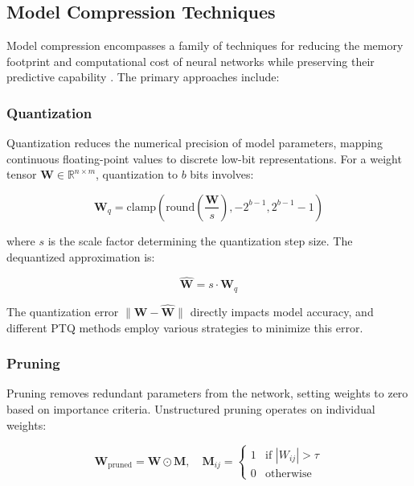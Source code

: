 \documentclass[11pt,a4paper]{article}
\begin{document}
\subsection{Model Compression Techniques}

Model compression encompasses a family of techniques for reducing the memory footprint and computational cost of neural networks while preserving their predictive capability \cite{cheng2017survey}. The primary approaches include:

\subsubsection{Quantization}

Quantization reduces the numerical precision of model parameters, mapping continuous floating-point values to discrete low-bit representations. For a weight tensor $\mathbf{W} \in \mathbb{R}^{n \times m}$, quantization to $b$ bits involves:

\begin{equation}
\mathbf{W}_q = \text{clamp}\left(\text{round}\left(\frac{\mathbf{W}}{s}\right), -2^{b-1}, 2^{b-1}-1\right)
\end{equation}

where $s$ is the scale factor determining the quantization step size. The dequantized approximation is:

\begin{equation}
\hat{\mathbf{W}} = s \cdot \mathbf{W}_q
\end{equation}

The quantization error $\|\mathbf{W} - \hat{\mathbf{W}}\|$ directly impacts model accuracy, and different PTQ methods employ various strategies to minimize this error.

\subsubsection{Pruning}

Pruning removes redundant parameters from the network, setting weights to zero based on importance criteria. Unstructured pruning operates on individual weights:

\begin{equation}
\mathbf{W}_{\text{pruned}} = \mathbf{W} \odot \mathbf{M}, \quad \mathbf{M}_{ij} = \begin{cases} 1 & \text{if } |W_{ij}| > \tau \\ 0 & \text{otherwise} \end{cases}
\end{equation}
\end{document}
